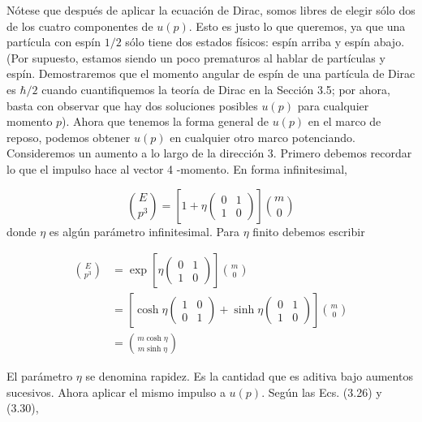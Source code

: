 Nótese que después de aplicar la ecuación de Dirac, somos libres de elegir sólo dos de los cuatro componentes de $u(p)$. Esto es justo lo que queremos, ya que una partícula con espín $1 / 2$ sólo tiene dos estados físicos: espín arriba y espín abajo. (Por supuesto, estamos siendo un poco prematuros al hablar de partículas y espín. Demostraremos que el momento angular de espín de una partícula de Dirac es $\hbar / 2$ cuando cuantifiquemos la teoría de Dirac en la Sección 3.5; por ahora, basta con observar que hay dos soluciones posibles $u(p)$ para cualquier momento $p$). Ahora que tenemos la forma general de $u(p)$ en el marco de reposo, podemos obtener $u(p)$ en cualquier otro marco potenciando. Consideremos un aumento a lo largo de la dirección 3. Primero debemos recordar lo que el impulso hace al vector 4 -momento. En forma infinitesimal,


$$
\binom{E}{p^{3}}=\left[1+\eta\left(\begin{array}{ll}
0 & 1 \\
1 & 0
\end{array}\right)\right]\binom{m}{0}
$$
donde $\eta$ es algún parámetro infinitesimal. Para $\eta$ finito debemos escribir

\begin{align*}
\binom{E}{p^{3}} & =\exp \left[\eta\left(\begin{array}{ll}
0 & 1 \\
1 & 0
\end{array}\right)\right]\binom{m}{0} \\
& =\left[\cosh \eta\left(\begin{array}{ll}
1 & 0 \\
0 & 1
\end{array}\right)+\sinh \eta\left(\begin{array}{ll}
0 & 1 \\
1 & 0
\end{array}\right)\right]\binom{m}{0}  \tag{3.48}\\
& =\binom{m \cosh \eta}{m \sinh \eta}
\end{align*}


El parámetro $\eta$ se denomina rapidez. Es la cantidad que es aditiva bajo aumentos sucesivos. Ahora aplicar el mismo impulso a $u(p)$. Según las Ecs. (3.26) y (3.30),


